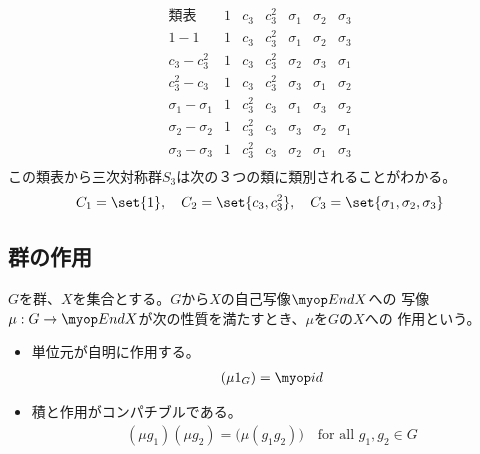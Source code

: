 	\begin{equation}\label{eq:三次対称群の類表}\begin{array}{c|ccccccc} %
		\text{類表} & 1 & c_3 & c_3^2 & \sigma_1 & \sigma_2 & \sigma_3 \\\hline
		1-1 & 1 & c_3 & c_3^2 & \sigma_1 & \sigma_2 & \sigma_3 \\
		c_3-c_3^2 & 1 & c_3 & c_3^2 & \sigma_2 & \sigma_3 & \sigma_1 \\
		c_3^2-c_3 & 1 & c_3 & c_3^2 & \sigma_3 & \sigma_1 & \sigma_2 \\
		\sigma_1-\sigma_1 & 1 & c_3^2 & c_3 & \sigma_1 & \sigma_3 & \sigma_2 \\
		\sigma_2-\sigma_2 & 1 & c_3^2 & c_3 & \sigma_3 & \sigma_2 & \sigma_1 \\
		\sigma_3-\sigma_3 & 1 & c_3^2 & c_3 & \sigma_2 & \sigma_1 & \sigma_3 \\
	\end{array}\end{equation} %
	この類表から三次対称群$S_3$は次の３つの類に類別されることがわかる。
	\begin{equation*}\begin{split} %
		C_1 = \set{1}
		,\quad C_2 = \set{c_3,c_3^2}
		,\quad C_3 = \set{\sigma_1,\sigma_2,\sigma_3}
	\end{split}\end{equation*} %
%
\subsection{群の作用}\label{s2:群の作用} %
	\begin{definition}[群の作用]\label{def:群の作用} %
		$G$を群、$X$を集合とする。$G$から$X$の自己写像$\End X$への
		写像$\mu:G\to \End X$が次の性質を満たすとき、$\mu$を$G$の$X$への
		作用という。
		\begin{itemize}\setlength{\itemsep}{-1mm} %
			\item 単位元が自明に作用する。
			\begin{equation*}\begin{split} %
				(\mu 1_G) = \myid
			\end{split}\end{equation*} %
			\item 積と作用がコンパチブルである。
			\begin{equation*}\begin{split} %
				(\mu g_1)(\mu g_2) = \bigl(\mu(g_1g_2)\bigr)
				\quad\text{for all }g_1,g_2\in G
			\end{split}\end{equation*} %
		\end{itemize} %
	\end{definition} %

